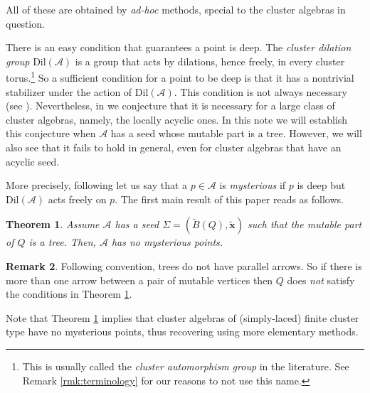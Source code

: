 \documentclass{amsart}
\newcommand{\seed}{\Sigma}
\newcommand{\excluster}[1]{\widetilde{\mathbf{#1}}}
\newcommand{\exmatrix}[1]{\widetilde{#1}}
\newcommand{\var}{\mathcal{A}}
\numberwithin{equation}{section}
\newtheorem{theorem}{Theorem}[section]
\theoremstyle{definition}
\newtheorem{remark}[theorem]{Remark}
\newcommand{\dil}{\mathrm{Dil}}
\begin{document}
All of these are obtained by \emph{ad-hoc} methods, special to the cluster algebras in question. 

There is an easy condition that guarantees a point is deep. The \emph{cluster dilation group} $\dil(\var)$ is a group that acts by dilations, hence freely, in every cluster torus.\footnote{This is usually called the \emph{cluster automorphism group} in the literature. See Remark \ref{rmk:terminology} for our reasons to not use this name.} So a sufficient condition for a point to be deep is that it has a nontrivial stabilizer under the action of $\dil(\var)$. This condition is not always necessary (see \cite[Proposition 3.22]{deep}). Nevertheless, in \cite[Conjecture 1.1]{deep} we conjecture that it is necessary for a large class of cluster algebras, namely, the locally acyclic ones. In this note we will establish this conjecture when $\var$ has a seed whose mutable part is a tree. However, we will also see that it fails to hold in general, even for cluster algebras that have an acyclic seed.

More precisely, following \cite{deep} let us 
say that a $p \in \var$ is \emph{mysterious} if $p$ is deep but $\dil(\var)$ acts freely on $p$. The first main result of this paper reads as follows. 

\begin{theorem}\label{thm:main-intro}
Assume $\var$ has a seed $\seed = (\exmatrix{B}(Q), \excluster{x})$ such that the mutable part of $Q$ is a tree. Then, $\var$ has no mysterious points.     
\end{theorem}


\begin{remark}
Following convention, trees do not have parallel arrows. So if there is more than one arrow between a pair of mutable vertices then $Q$ does \emph{not} satisfy the conditions in Theorem \ref{thm:main-intro}.
\end{remark}

Note that Theorem \ref{thm:main-intro} implies that cluster algebras of (simply-laced) finite cluster type have no mysterious points, thus recovering \cite[Theorem 5.19]{deep} using more elementary methods.
\end{document}
